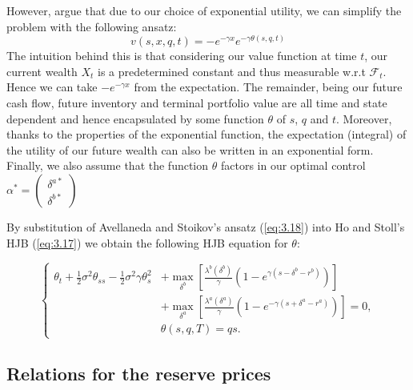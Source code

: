 However, \cite{AS2008} argue that due to our choice of exponential 
utility, we can simplify the problem with the following ansatz:
\begin{equation}\label{eq:3.18}
    v(s,x,q,t)=-e^{-\gamma x}e^{-\gamma\theta(s,q,t)}
\end{equation}
The intuition behind this is that considering our value function at 
time $t$, our current wealth $X_t$ is a predetermined constant and thus
measurable w.r.t $\mathcal{F}_t$. Hence we can take $-e^{-\gamma x}$
from the expectation. The remainder, being our future cash flow, 
future inventory and terminal portfolio value are all time and state
dependent and hence encapsulated by some function $\theta$ of $s$, $q$
and $t$. Moreover, thanks to the properties of the exponential function, 
the expectation (integral) of the utility of our future wealth can also be 
written in an exponential form. Finally, we also assume that the function
$\theta$ factors in our optimal control $\alpha^*=\begin{pmatrix}\delta^{a*}\\\delta^{b*}\end{pmatrix}$

By substitution of Avellaneda and Stoikov's ansatz (\ref{eq:3.18}) into 
Ho and Stoll's HJB (\ref{eq:3.17}) we obtain the following HJB equation
for $\theta$:
\begin{theorem}\label{thm:3.7.2}
    \begin{equation}\label{eq:3.19}
        \left\{
            \begin{aligned}
                \theta_t+\frac{1}{2}\sigma^2\theta_{ss}-\frac{1}{2}\sigma^2\gamma\theta_{s}^2&+\max\limits_{\delta^b}\left[\frac{\lambda^b(\delta^b)}{\gamma}(1-e^{\gamma(s-\delta^b-r^b)})\right]\\
                &+\max\limits_{\delta^a}\left[\frac{\lambda^a(\delta^a)}{\gamma}(1-e^{-\gamma(s+\delta^a-r^a)})\right]=0,\\
                &\theta(s,q,T)=qs.
            \end{aligned}
        \right.
    \end{equation}
\end{theorem}

\subsection*{Relations for the reserve prices}


